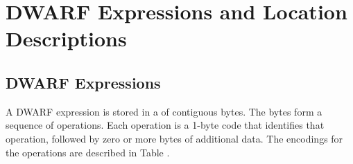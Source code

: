 \section{DWARF Expressions and Location Descriptions}
\label{datarep:dwarfexpressionsandlocationdescriptions}
\subsection{DWARF Expressions}
\label{datarep:dwarfexpressions}

A 
DWARF expression is stored in a  of contiguous
bytes. The bytes form a sequence of operations. Each operation
is a 1-byte code that identifies that operation, followed by
zero or more bytes of additional data. The encodings for the
operations are described in 
Table . 


